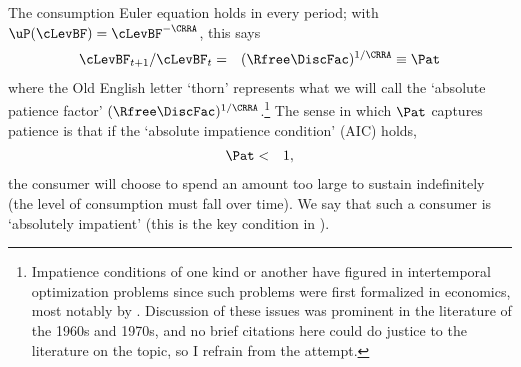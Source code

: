\documentclass[titlepage]{\econtex}\providecommand{\texname}{BufferStockTheory}
\begin{document}
\hypertarget{AIC}{}
The consumption Euler equation holds in every period; with $\uP(\cLevBF)=\cLevBF^{-\CRRA}$, this says
\begin{eqnarray}
 \cLevBF_{t+1}/\cLevBF_{t} & = & (\Rfree\DiscFac)^{1/\CRRA} \equiv \Pat \label{eq:cGrowPF} \label{eq:Pat}
\end{eqnarray}
where the Old English letter `thorn' represents what we will call the
`absolute patience factor' $(\Rfree
\DiscFac)^{1/\CRRA}$.\footnote{Impatience conditions of one kind or
  another have figured in intertemporal optimization problems since
  such problems were first formalized in economics, most notably by \cite{ramseySave}.
  Discussion of these issues was prominent in the literature of the
  1960s and 1970s, and no brief citations here could do justice to the literature on the topic, so I refrain from the attempt.}  The sense in which $\Pat$ captures
patience is that if the `absolute impatience condition' (AIC) holds,
\begin{eqnarray}
  \label{eq:AIC}
  \Pat & < & 1,
\end{eqnarray}
the consumer will choose to spend an amount too large to sustain indefinitely (the
level of consumption must fall over time).  We say that such a consumer is
`absolutely impatient' (this is the key condition in \cite{bewleyPIH}).
\end{document}
